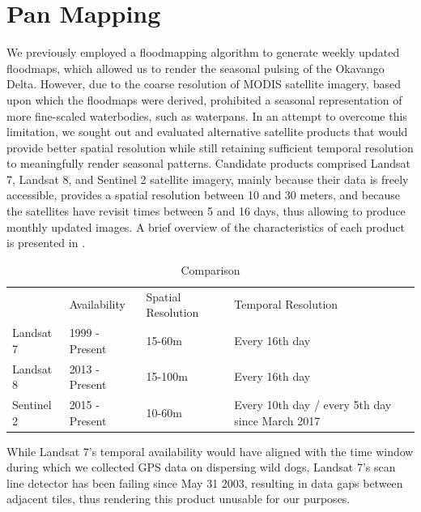 \documentclass[abstract=off,10pt,a4paper,bibliography=totocnumbered]{article}
\begin{document}
\section{Pan Mapping}
We previously employed a floodmapping algorithm to generate weekly updated
floodmaps, which allowed us to render the seasonal pulsing of the Okavango
Delta. However, due to the coarse resolution of MODIS satellite imagery, based
upon which the floodmaps were derived, prohibited a seasonal representation of
more fine-scaled waterbodies, such as waterpans. In an attempt to overcome this
limitation, we sought out and evaluated alternative satellite products that
would provide better spatial resolution while still retaining sufficient
temporal resolution to meaningfully render seasonal patterns. Candidate products
comprised Landsat 7, Landsat 8, and Sentinel 2 satellite imagery, mainly because
their data is freely accessible, provides a spatial resolution between 10 and 30
meters, and because the satellites have revisit times between 5 and 16 days,
thus allowing to produce monthly updated images. A brief overview of the
characteristics of each product is presented in .

\begin{table}
  \caption{Comparison}
  \label{SatelliteData}
  \begin{tabular}{llll}
             & Availability   & Spatial Resolution & Temporal Resolution                             \\
  Landsat 7  & 1999 - Present & 15-60m             & Every 16th day                                  \\
  Landsat 8  & 2013 - Present & 15-100m            & Every 16th day                                  \\
  Sentinel 2 & 2015 - Present & 10-60m             & Every 10th day / every 5th day since March 2017
  \end{tabular}
\end{table}

While Landsat 7's temporal availability would have aligned with the time window
during which we collected GPS data on dispersing wild dogs, Landsat 7's scan
line detector has been failing since May 31 2003, resulting in data gaps between
adjacent tiles, thus rendering this product unusable for our purposes.
\end{document}
